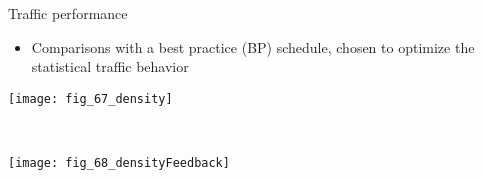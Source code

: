 \begin{frame}{Traffic performance}
    \begin{itemize}
    \item Comparisons with a best practice (BP) schedule, chosen to optimize the statistical traffic behavior
    \end{itemize}
    
    \begin{center}
        \begin{minipage}[c]{0.45\textwidth}
        \texttt{[image: fig\_67\_density]}%
        \end{minipage}
        ~
        \begin{minipage}[c]{0.45\textwidth}
        \texttt{[image: fig\_68\_densityFeedback]}%
        \end{minipage}%
    \end{center}
\end{frame}